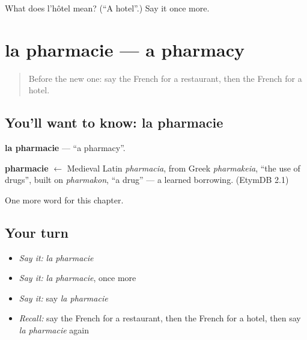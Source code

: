 \begin{tcolorbox}[breakable,colback=teal!4,colframe=teal!35!black,title={Before you move on}]
What does l'hôtel mean? (\textquotedblleft{}A hotel\textquotedblright{}.) Say it once more.
\end{tcolorbox}
\section[la pharmacie]{la pharmacie — a pharmacy}

\label{lesson:FR-C101-pharmacie}



\begin{quote}
Before the new one: say the French for a restaurant, then the French for a hotel.
\end{quote}

\subsection*{You'll want to know: la pharmacie}
\textbf{la pharmacie} — \textquotedblleft{}a pharmacy\textquotedblright{}.

\begin{cousinweb}
\textbf{pharmacie} $\leftarrow$ Medieval Latin \emph{pharmacia}, from Greek \emph{pharmakeia}, \textquotedblleft{}the use of drugs\textquotedblright{}, built on \emph{pharmakon}, \textquotedblleft{}a drug\textquotedblright{} — a learned borrowing. (EtymDB 2.1)
\end{cousinweb}

\begin{grammarlens}[title={What you've built}]
One more word for this chapter.
\end{grammarlens}

\subsection*{Your turn}
\begin{itemize}
\raggedright
  \item \emph{Say it:} \emph{la pharmacie}
  \item \emph{Say it:} \emph{la pharmacie}, once more
  \item \emph{Say it:} say \emph{la pharmacie}
  \item \emph{Recall:} say the French for a restaurant, then the French for a hotel, then say \emph{la pharmacie} again
\end{itemize}

